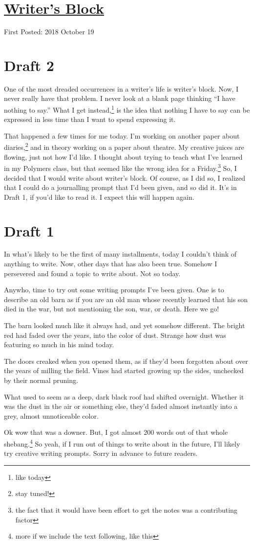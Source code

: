 \documentclass[12pt]{article}[titlepage]
\newcommand{\say}[1]{``#1''}
\newcommand{\1}{\={a}}
\newcommand{\2}{\={e}}
\newcommand{\3}{\={\i}}
\newcommand{\4}{\=o}
\newcommand{\5}{\=u}
\newcommand{\6}{\={A}}
\renewcommand{\,}{\textsuperscript{,}}
\begin{document}
\doublespacing
\section{\href{writers-block.html}{Writer's Block}}
First Posted: 2018 October 19
\section{Draft 2}
One of the most dreaded occurrences in a writer's life is writer's block.
Now, I never really have that problem.
I never look at a blank page thinking \say{I have nothing to say.}
What I get instead,\footnote{like today} is the idea that nothing I have to say can be expressed in less time than I want to spend expressing it.

That happened a few times for me today.
I'm working on another paper about diaries,\footnote{stay tuned!} and in theory working on a paper about theatre.
My creative juices are flowing, just not how I'd like.
I thought about trying to teach what I've learned in my Polymers class, but that seemed like the wrong idea for a Friday.\footnote{the fact that it would have been effort to get the notes was a contributing factor}
So, I decided that I would write about writer's block.
Of course, as I did so, I realized that I could do a journalling prompt that I'd been given, and so did it.
It's in Draft 1, if you'd like to read it.
I expect this will happen again.
\section{Draft 1}
In what's likely to be the first of many installments, today I couldn't think of anything to write.
Now, other days that has also been true.
Somehow I persevered and found a topic to write about.
Not so today.

Anywho, time to try out some writing prompts I've been given.
One is to describe an old barn as if you are an old man whose recently learned that his son died in the war, but not mentioning the son, war, or death.
Here we go!

The barn looked much like it always had, and yet somehow different.
The bright red had faded over the years, into the color of dust.
Strange how dust was featuring so much in his mind today.

The doors creaked when you opened them, as if they'd been forgotten about over the years of milling the field.
Vines had started growing up the sides, unchecked by their normal pruning.

What used to seem as a deep, dark black roof had shifted overnight.
Whether it was the dust in the air or something else, they'd faded almost instantly into a grey, almost unnoticeable color.

Ok wow that was a downer.
But, I got almost 200 words out of that whole shebang.\footnote{more if we include the text following, like this}
So yeah, if I run out of things to write about in the future, I'll likely try creative writing prompts.
Sorry in advance to future readers.
\end{document}
